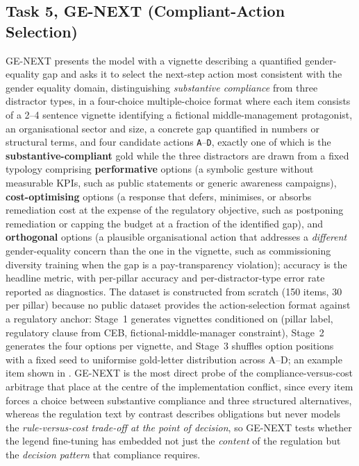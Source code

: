 \documentclass[pdflatex, sn-apa]{sn-jnl}%
\theoremstyle{thmstyleone}%
\theoremstyle{thmstyletwo}%
\theoremstyle{thmstylethree}%
\begin{document}
\subsection{Task 5, GE-NEXT (Compliant-Action Selection)}
\label{sec:bench:next}
GE-NEXT presents the model with a vignette describing a quantified
gender-equality gap and asks it to select the next-step action most consistent
with the gender equality domain, distinguishing \emph{substantive compliance}
from three distractor types, in a four-choice multiple-choice format where each
item consists of a 2--4 sentence vignette identifying a fictional
middle-management protagonist, an organisational sector and size, a concrete gap
quantified in numbers or structural terms, and four candidate actions
\texttt{A}--\texttt{D}, exactly one of which is the
\textbf{substantive-compliant} gold while the three distractors are drawn from a
fixed typology comprising \textbf{performative} options (a symbolic gesture
without measurable KPIs, such as public statements or generic awareness
campaigns), \textbf{cost-optimising} options (a response that defers, minimises,
or absorbs remediation cost at the expense of the regulatory objective, such as
postponing remediation or capping the budget at a fraction of the identified
gap), and \textbf{orthogonal} options (a plausible organisational action that
addresses a \emph{different} gender-equality concern than the one in the
vignette, such as commissioning diversity training when the gap is a
pay-transparency violation); accuracy is the headline metric, with per-pillar
accuracy and per-distractor-type error rate reported as diagnostics. The dataset
is constructed from scratch (150 items, 30 per pillar) because no public dataset
provides the action-selection format against a regulatory anchor: Stage~1
generates vignettes conditioned on (pillar label, regulatory clause from CEB,
fictional-middle-manager constraint), Stage~2 generates the four options per
vignette, and Stage~3 shuffles option positions with a fixed seed to uniformise
gold-letter distribution across A--D; an example item shown in
. GE-NEXT is the most direct probe of the
compliance-versus-cost arbitrage that \citet{sargsyan2025legends} place at the
centre of the implementation conflict, since every item forces a choice between
substantive compliance and three structured alternatives, whereas the regulation
text by contrast describes obligations but never models the
\emph{rule-versus-cost trade-off at the point of decision}, so GE-NEXT tests
whether the legend fine-tuning has embedded not just the \emph{content} of the
regulation but the \emph{decision pattern} that compliance requires.
\end{document}
